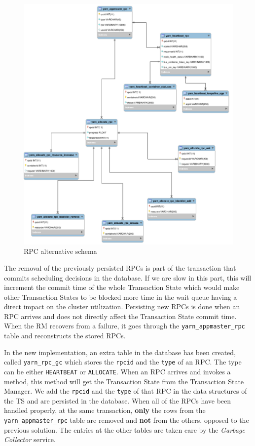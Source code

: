 \begin{figure}
\centering
\includegraphics[scale=0.3]{resources/images/Implementation/rpc_fk_alternate_schema.png}
\caption{RPC alternative schema}
\label{fig:impl_fk_alternate_schema}
\end{figure}

The removal of the previously persisted RPCs is part of the
transaction that commits scheduling decisions in the database. If we
are slow in this part, this will increment the commit time of the
whole Transaction State which would make other Transaction States to
be blocked more time in the wait queue having a direct impact on the
cluster utilization. Persisting new RPCs is done when an RPC arrives
and does not directly affect the Transaction State commit time. When
the RM recovers from a failure, it goes through the
\texttt{yarn\_appmaster\_rpc} table and reconstructs the stored RPCs.

In the new implementation, an extra table in the
database has been created, called \texttt{yarn\_rpc\_gc} which stores the \texttt{rpcid}
and the \texttt{type} of an RPC. The type can be either
\texttt{HEARTBEAT} or \texttt{ALLOCATE}. When an RPC arrives and
invokes a method, this method will get the Transaction State from the
Transaction State Manager. We add the \texttt{rpcid} and the
\texttt{type} of that RPC in the data structures of the TS and are
persisted in the database. When all of the RPCs have been handled
properly, at the same transaction, \textbf{only} the rows from
the \texttt{yarn\_appmaster\_rpc} table are removed and \textbf{not}
from the others, opposed to the previous solution. The entries at the other tables are taken care by the
\emph{Garbage Collector} service.

